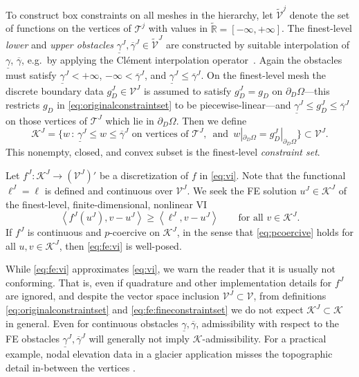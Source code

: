 \documentclass[review,hidelinks,onefignum,onetabnum,final]{siamart220329}  %
\newcommand{\RR}{\mathbb{R}}
\newcommand{\cK}{\mathcal{K}}
\newcommand{\ip}[2]{\left<#1,#2\right>}
\begin{document}
To construct box constraints on all meshes in the hierarchy, let $\tilde{\mathcal{V}}^j$ denote the set of functions on the vertices of $\mathcal{T}^j$ with values in $\tilde{\RR} = [-\infty,+\infty]$.  The finest-level \emph{lower} and \emph{upper obstacles} $\underline{\gamma}^J, \overline{\gamma}^J \in \tilde{\mathcal{V}}^J$ are constructed by suitable interpolation of $\underline{\gamma}$, $\overline{\gamma}$, e.g.~by applying the Cl\'ement interpolation operator~\cite{Carstensen2006}.  Again the obstacles must satisfy $\underline{\gamma}^J < +\infty$, $-\infty < \overline{\gamma}^J$, and $\underline{\gamma}^J \le \overline{\gamma}^J$.  On the finest-level mesh the discrete boundary data $g_D^J \in \mathcal{V}^J$ is assumed to satisfy $g_D^J = g_D$ on $\partial_D \Omega$---this restricts $g_D$ in \eqref{eq:originalconstraintset} to be piecewise-linear---and $\underline{\gamma}^J \le g_D^J \le \overline{\gamma}^J$ on those vertices of $\mathcal{T}^J$ which lie in $\partial_D \Omega$.  Then we define
\begin{equation}
\mathcal{K}^J = \big\{w\,:\,\underline{\gamma}^J \le w \le \overline{\gamma}^J \text{ on vertices of } \mathcal{T}^J, \, \text{ and } \, w|_{\partial_D\Omega} = g_D^J|_{\partial_D\Omega}\big\} \subset \mathcal{V}^J. \label{eq:fe:fineconstraintset}
\end{equation}
This nonempty, closed, and convex subset is the finest-level \emph{constraint set}.

Let $f^J:\mathcal{K}^J \to (\mathcal{V}^J)'$ be a discretization of $f$ in \eqref{eq:vi}.  Note that the functional $\ell^J=\ell$ is defined and continuous over $\mathcal{V}^J$.  We seek the FE solution $u^J \in \mathcal{K}^J$ of the finest-level, finite-dimensional, nonlinear VI
\begin{equation}
\ip{f^J(u^J)}{v-u^J} \ge \ip{\ell^J}{v-u^J} \qquad \text{for all } v\in \cK^J. \label{eq:fe:vi}
\end{equation}
If $f^J$ is continuous and $p$-coercive on $\mathcal{K}^J$, in the sense that \eqref{eq:pcoercive} holds for all $u,v \in \mathcal{K}^J$, then \eqref{eq:fe:vi} is well-posed.

While \eqref{eq:fe:vi} approximates \eqref{eq:vi}, we warn the reader that it is usually not conforming.  That is, even if quadrature and other implementation details for $f^J$ are ignored, and despite the vector space inclusion $\mathcal{V}^J \subset \mathcal{V}$, from definitions \eqref{eq:originalconstraintset} and \eqref{eq:fe:fineconstraintset} we do not expect $\mathcal{K}^J \subset \mathcal{K}$ in general.  Even for continuous obstacles $\underline{\gamma}, \overline{\gamma}$, admissibility with respect to the FE obstacles $\underline{\gamma}^J, \overline{\gamma}^J$ will generally not imply $\mathcal{K}$-admissibility.  For a practical example, nodal elevation data in a glacier application misses the topographic detail in-between the vertices \cite{Bueler2016}.
\end{document}
